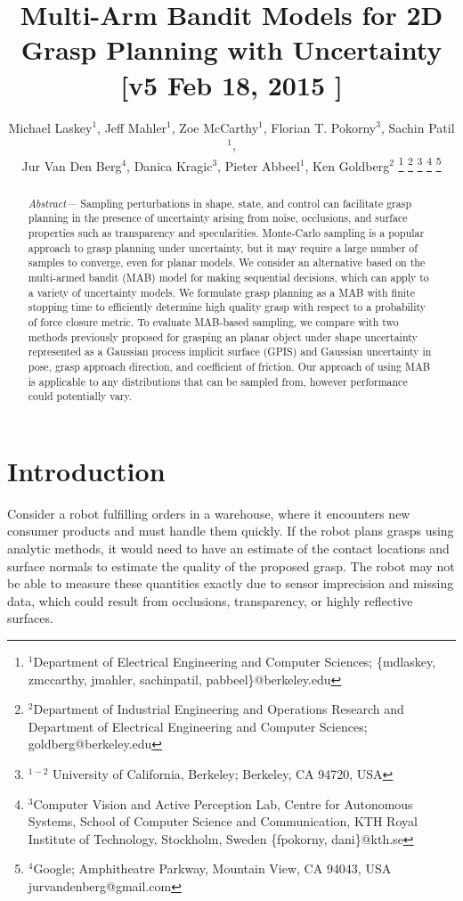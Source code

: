 \documentclass[journal,transmag]{IEEEtran}%
\title{\LARGE \bf
Multi-Arm Bandit Models for 2D Grasp Planning with Uncertainty  [v5 Feb 18, 2015 ] }
\author{Michael Laskey$^1$, Jeff Mahler$^1$, Zoe McCarthy$^1$,  Florian T. Pokorny$^3$, Sachin Patil$^1$,\\ Jur Van Den Berg$^4$,  Danica Kragic$^3$, Pieter Abbeel$^1$, Ken Goldberg$^2$%
\thanks{$^1$Department of Electrical Engineering and Computer Sciences; {\small \{mdlaskey, zmccarthy, jmahler, sachinpatil, pabbeel\}@berkeley.edu}}%
\thanks{$^2$Department of Industrial Engineering and Operations Research and Department of Electrical Engineering and Computer Sciences; {\small goldberg@berkeley.edu}}%
\thanks{$^{1-2}$ University of California, Berkeley;  Berkeley, CA 94720, USA}%
\thanks{$^3$Computer Vision and Active Perception Lab, Centre for Autonomous Systems, School of Computer Science and Communication, KTH Royal Institute of Technology, Stockholm, Sweden {\small \{fpokorny, dani\}@kth.se}}%
\thanks{$^4$Google; Amphitheatre Parkway, Mountain View, CA 94043, USA {\small jurvandenberg@gmail.com}}%
}
\begin{document}
\maketitle
\thispagestyle{empty}
\pagestyle{empty}



\begin{abstract}
\textit{Abstract---}
Sampling perturbations in shape, state, and control can facilitate grasp planning in the presence of uncertainty arising from noise, occlusions, and surface properties such as transparency and specularities. 
Monte-Carlo sampling is a popular approach to grasp planning under uncertainty, but it may require a large number of samples to converge, even for planar models.
We consider an alternative based on the multi-armed bandit (MAB) model for making sequential decisions, which can apply to a variety of uncertainty models.
We formulate grasp planning as a MAB  with finite stopping time to efficiently determine high quality grasp with respect to a probability of force closure metric.
To evaluate MAB-based sampling, we compare with two methods previously proposed for grasping an planar object under shape uncertainty represented as a Gaussian process implicit surface (GPIS) and Gaussian uncertainty in pose, grasp approach direction, and coefficient of friction.
Our approach of using MAB is applicable to any distributions that can be sampled from, however performance could potentially vary. 
\end{abstract}



\section{Introduction}



Consider a robot fulfilling orders in a warehouse, where it encounters new consumer products and must handle them quickly. If the robot plans grasps using analytic methods, it would need to have an estimate of the contact locations and surface normals to estimate the quality of the proposed grasp. The robot may not be able to measure these quantities exactly due to sensor imprecision and missing data, which could result from occlusions, transparency, or highly reflective surfaces.
\end{document}
